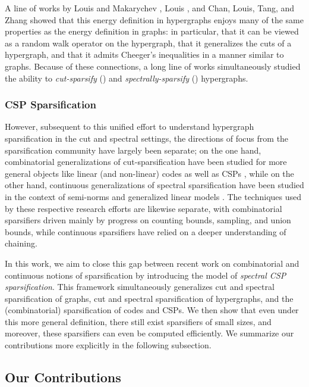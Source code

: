 \documentclass[11pt]{article}
\theoremstyle{definition}
\begin{document}
A line of works by Louis and Makarychev \cite{LM14}, Louis \cite{Lou15}, and Chan, Louis, Tang, and Zhang \cite{CLTZ18} showed that this energy definition in hypergraphs enjoys many of the same properties as the energy definition in graphs: in particular, that it can be viewed as a random walk operator on the hypergraph, that it generalizes the cuts of a hypergraph, and that it admits Cheeger's inequalities in a manner similar to graphs. Because of these connections, a long line of works simultaneously studied the ability to \emph{cut-sparsify} (\cite{KK15, CKN20}) and \emph{spectrally-sparsify} (\cite{SY19, BST19, KKTY21a, KKTY21b, JLS22, Lee23}) hypergraphs.

\subsubsection{CSP Sparsification} 

However, subsequent to this unified effort to understand hypergraph sparsification in the cut and spectral settings, the directions of focus from the sparsification community have largely been separate; on the one hand, combinatorial generalizations of cut-sparsification have been studied for more general objects like linear (and non-linear) codes as well as CSPs \cite{KPS24, KPS24c, BrakensiekG}, while on the other hand, continuous generalizations of spectral sparsification have been studied in the context of semi-norms and generalized linear models \cite{JLLS23, JLLS24}. The techniques used by these respective research efforts are likewise separate, with combinatorial sparsifiers driven mainly by progress on counting bounds, sampling, and union bounds, while continuous sparsifiers have relied on a deeper understanding of chaining. 

In this work, we aim to close this gap between recent work on combinatorial and continuous notions of sparsification by introducing the model of \emph{spectral CSP sparsification}. This framework simultaneously generalizes cut and spectral sparsification of graphs, cut and spectral sparsification of hypergraphs, and the (combinatorial) sparsification of codes and CSPs. We then show that even under this more general definition, there still exist sparsifiers of small sizes, and moreover, these sparsifiers can even be computed efficiently. We summarize our contributions more explicitly in the following subsection.

\subsection{Our Contributions}
\end{document}

